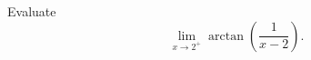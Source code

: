 \begin{frame}
\begin{example} %
Evaluate 
\[
\lim_{x\rightarrow 2^+} \arctan \left( \frac{1}{x-2}\right) .
\]
\end{example}
\end{frame}
